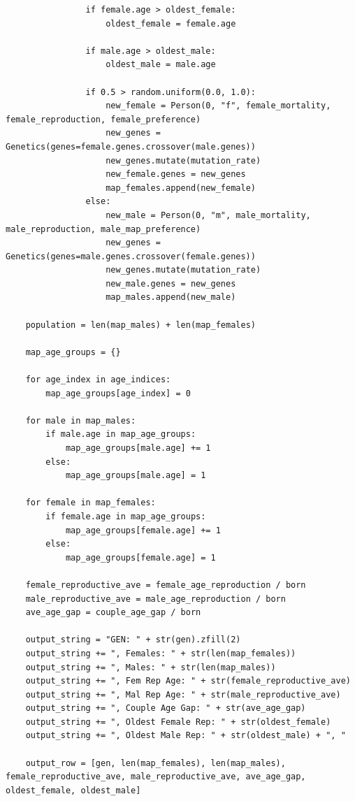 \documentclass[authoryearcitations]{UoYCSproject}
\begin{document}
\begin{landscape}
\begin{verbatim}
                if female.age > oldest_female:
                    oldest_female = female.age

                if male.age > oldest_male:
                    oldest_male = male.age

                if 0.5 > random.uniform(0.0, 1.0):
                    new_female = Person(0, "f", female_mortality, female_reproduction, female_preference)
                    new_genes = Genetics(genes=female.genes.crossover(male.genes))
                    new_genes.mutate(mutation_rate)
                    new_female.genes = new_genes
                    map_females.append(new_female)
                else:
                    new_male = Person(0, "m", male_mortality, male_reproduction, male_map_preference)
                    new_genes = Genetics(genes=male.genes.crossover(female.genes))
                    new_genes.mutate(mutation_rate)
                    new_male.genes = new_genes
                    map_males.append(new_male)

    population = len(map_males) + len(map_females)

    map_age_groups = {}

    for age_index in age_indices:
        map_age_groups[age_index] = 0

    for male in map_males:
        if male.age in map_age_groups:
            map_age_groups[male.age] += 1
        else:
            map_age_groups[male.age] = 1

    for female in map_females:
        if female.age in map_age_groups:
            map_age_groups[female.age] += 1
        else:
            map_age_groups[female.age] = 1

    female_reproductive_ave = female_age_reproduction / born
    male_reproductive_ave = male_age_reproduction / born
    ave_age_gap = couple_age_gap / born

    output_string = "GEN: " + str(gen).zfill(2)
    output_string += ", Females: " + str(len(map_females))
    output_string += ", Males: " + str(len(map_males))
    output_string += ", Fem Rep Age: " + str(female_reproductive_ave)
    output_string += ", Mal Rep Age: " + str(male_reproductive_ave)
    output_string += ", Couple Age Gap: " + str(ave_age_gap)
    output_string += ", Oldest Female Rep: " + str(oldest_female)
    output_string += ", Oldest Male Rep: " + str(oldest_male) + ", "

    output_row = [gen, len(map_females), len(map_males), female_reproductive_ave, male_reproductive_ave, ave_age_gap, oldest_female, oldest_male]


\end{verbatim}
\end{landscape}
\end{document}
